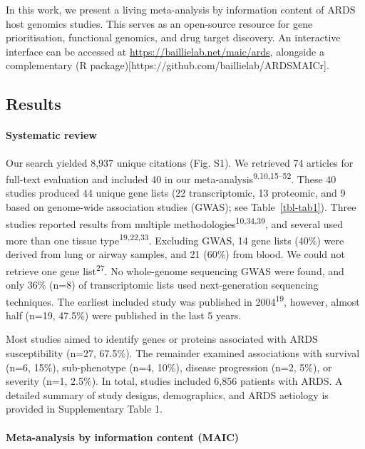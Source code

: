 \documentclass[
  11,
  a4paper,
]{article}
\let\oldparagraph\paragraph
\renewcommand{\paragraph}[1]{\oldparagraph{#1}\mbox{}}
\begin{document}
In this work, we present a living meta-analysis by information content
of ARDS host genomics studies. This serves as an open-source resource
for gene prioritisation, functional genomics, and drug target discovery.
An interactive interface can be accessed at
\url{https://baillielab.net/maic/ards}, alongside a complementary (R
package){[}https://github.com/baillielab/ARDSMAICr{]}.

\newpage

\hypertarget{results}{%
\subsection{Results}\label{results}}

\hypertarget{systematic-review}{%
\paragraph{Systematic review}\label{systematic-review}}

Our search yielded 8,937 unique citations (Fig. S1). We retrieved 74
articles for full-text evaluation and included 40 in our
meta-analysis\textsuperscript{9,10,15--52}. These 40 studies produced 44
unique gene lists (22 transcriptomic, 13 proteomic, and 9 based on
genome-wide association studies (GWAS); see Table~\ref{tbl-tab1}). Three
studies reported results from multiple
methodologies\textsuperscript{10,34,39}, and several used more than one
tissue type\textsuperscript{19,22,33}. Excluding GWAS, 14 gene lists
(40\%) were derived from lung or airway samples, and 21 (60\%) from
blood. We could not retrieve one gene list\textsuperscript{27}. No
whole-genome sequencing GWAS were found, and only 36\% (n=8) of
transcriptomic lists used next-generation sequencing techniques. The
earliest included study was published in 2004\textsuperscript{19},
however, almost half (n=19, 47.5\%) were published in the last 5 years.

Most studies aimed to identify genes or proteins associated with ARDS
susceptibility (n=27, 67.5\%). The remainder examined associations with
survival (n=6, 15\%), sub-phenotype (n=4, 10\%), disease progression
(n=2, 5\%), or severity (n=1, 2.5\%). In total, studies included 6,856
patients with ARDS. A detailed summary of study designs, demographics,
and ARDS aetiology is provided in Supplementary Table 1.

\hypertarget{meta-analysis-by-information-content-maic}{%
\paragraph{Meta-analysis by information content
(MAIC)}\label{meta-analysis-by-information-content-maic}}
\end{document}

